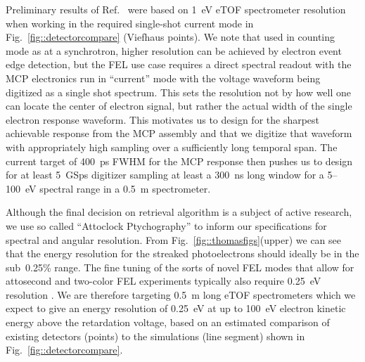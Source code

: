 Preliminary results of Ref.~\cite{Nick2018} were based on 1~eV eTOF spectrometer resolution when working in the required single-shot current mode in Fig.~\ref{fig::detectorcompare} (Viefhaus points).
We note that used in counting mode as at a synchrotron, higher resolution can be achieved by electron event edge detection, but the FEL use case requires a direct spectral readout with the MCP electronics run in ``current'' mode with the voltage waveform being digitized as a single shot spectrum.
This sets the resolution not by how well one can locate the center of electron signal, but rather the actual width of the single electron response waveform.
This motivates us to design for the sharpest achievable response from the MCP assembly and that we digitize that waveform with appropriately high sampling over a sufficiently long temporal span.
The current target of 400~ps FWHM for the MCP response then pushes us to design for at least 5~GSps digitizer sampling at least a 300~ns long window for a 5--100~eV spectral range in a 0.5~m spectrometer.

Although the final decision on retrieval algorithm is a subject of active research, we use so called ``Attoclock Ptychography'' \cite{Feurer2018} to inform our specifications for spectral and angular resolution.
From Fig.~\ref{fig::thomasfigs}(upper) we can see that the energy resolution for the streaked photoelectrons should ideally be in the sub~0.25\% range.
The fine tuning of the sorts of novel FEL modes that allow for attosecond \cite{xLEAP} and two-color \cite{LutmanFreshSlice2016} FEL experiments typically also require 0.25~eV resolution \cite{AlbertoPrivate}.
We are therefore targeting 0.5~m long eTOF spectrometers which we expect to give an energy resolution of 0.25~eV at up to 100~eV electron kinetic energy above the retardation voltage, based on an estimated comparison of existing detectors (points) to the simulations (line segment) shown in Fig.~\ref{fig::detectorcompare}.


